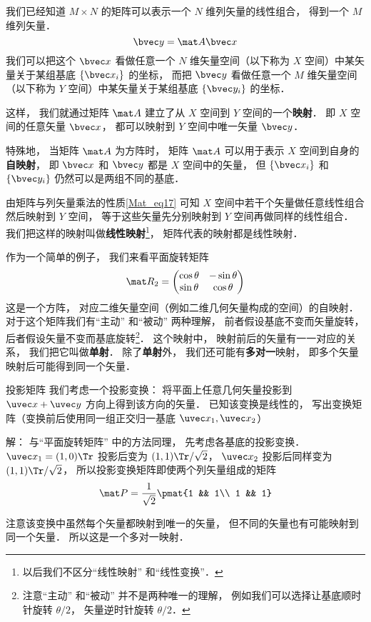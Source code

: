 

我们已经知道 $M\times N$ 的矩阵可以表示一个 $N$ 维列矢量的线性组合， 得到一个 $M$ 维列矢量．
\begin{equation}\label{MatLS_eq1}
\bvec y = \mat A \bvec x
\end{equation}
我们可以把这个 $\bvec x$ 看做任意一个 $N$ 维矢量空间（以下称为 $X$ 空间）中某矢量关于某组基底 $\{\bvec x_i\}$ 的坐标， 而把 $\bvec y$ 看做任意一个 $M$ 维矢量空间（以下称为 $Y$ 空间）中某矢量关于某组基底 $\{\bvec y_i\}$ 的坐标．

这样， 我们就通过矩阵 $\mat A$ 建立了从 $X$ 空间到 $Y$ 空间的一个\textbf{映射}． 即 $X$ 空间的任意矢量 $\bvec x$， 都可以映射到 $Y$ 空间中唯一矢量 $\bvec y$．

特殊地， 当矩阵 $\mat A$ 为方阵时， 矩阵 $\mat A$ 可以用于表示 $X$ 空间到自身的\textbf{自映射}， 即 $\bvec x$ 和 $\bvec y$ 都是 $X$ 空间中的矢量， 但 $\{\bvec x_i\}$ 和 $\{\bvec y_i\}$ 仍然可以是两组不同的基底．

由矩阵与列矢量乘法的性质\autoref{Mat_eq17} 可知 $X$ 空间中若干个矢量做任意线性组合然后映射到 $Y$ 空间， 等于这些矢量先分别映射到 $Y$ 空间再做同样的线性组合． 我们把这样的映射叫做\textbf{线性映射}\footnote{以后我们不区分“线性映射” 和“线性变换”．}， 矩阵代表的映射都是线性映射．

作为一个简单的例子， 我们来看平面旋转矩阵
\begin{equation}
\mat R_2 = \begin{pmatrix}
\cos\theta & - \sin\theta\\
\sin\theta &\cos\theta
\end{pmatrix}
\end{equation}
这是一个方阵， 对应二维矢量空间（例如二维几何矢量构成的空间）的自映射． 对于这个矩阵我们有“主动” 和“被动” 两种理解， 前者假设基底不变而矢量旋转， 后者假设矢量不变而基底旋转\footnote{注意“主动” 和“被动” 并不是两种唯一的理解， 例如我们可以选择让基底顺时针旋转 $\theta/2$， 矢量逆时针旋转 $\theta/2$．}． 这个映射中， 映射前后的矢量有一一对应的关系， 我们把它叫做\textbf{单射}． 除了\textbf{单射}外， 我们还可能有\textbf{多对一}映射， 即多个矢量映射后可能得到同一个矢量．

\begin{example}{投影矩阵}\label{MatLS_ex1}
我们考虑一个投影变换： 将平面上任意几何矢量投影到 $\uvec x + \uvec y$ 方向上得到该方向的矢量． 已知该变换是线性的， 写出变换矩阵（变换前后使用同一组正交归一基底 $\uvec x_1, \uvec x_2$）

解： 与“平面旋转矩阵” 中的方法同理， 先考虑各基底的投影变换． $\uvec x_1 = (1, 0)\Tr$ 投影后变为 $(1, 1)\Tr /\sqrt2$， $\uvec x_2$ 投影后同样变为 $(1, 1)\Tr /\sqrt2$， 所以投影变换矩阵即使两个列矢量组成的矩阵
\begin{equation}
\mat P = \frac{1}{\sqrt{2}} \pmat{1 && 1\\ 1 && 1}
\end{equation}

注意该变换中虽然每个矢量都映射到唯一的矢量， 但不同的矢量也有可能映射到同一个矢量． 所以这是一个多对一映射．
\end{example}

